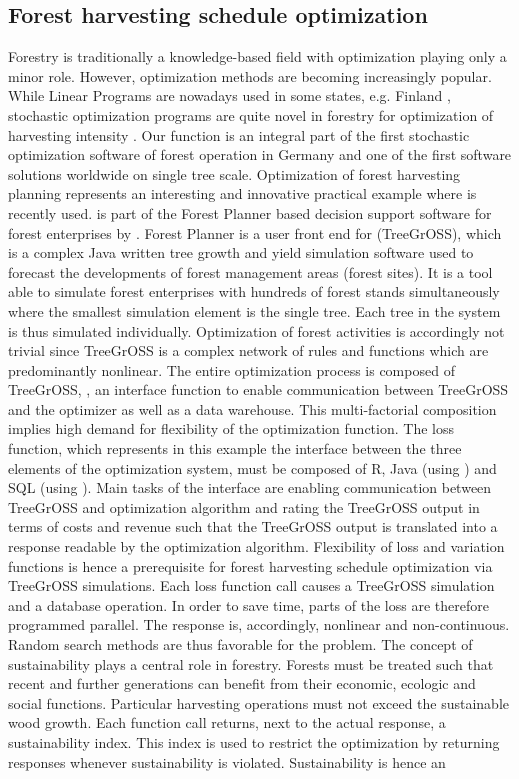 \subsection{Forest harvesting schedule optimization}
Forestry is traditionally a knowledge-based field with optimization playing only a minor role. However, optimization methods are becoming increasingly popular.  While Linear Programs are nowadays used  in some states, e.g. Finland \citep{redsven_2012}, stochastic optimization programs are quite novel in forestry for optimization of harvesting intensity \citep{kangas_2015}. Our function is an integral part of the first stochastic optimization software of forest operation in Germany and one of the first software solutions worldwide on single tree scale. Optimization of forest harvesting planning represents an interesting and innovative practical example where  is recently used.  is part of the Forest Planner based decision support software for forest enterprises by \citet{hansen_2014}. Forest Planner is a user front end for  (TreeGrOSS), which is  a complex Java written tree growth and yield simulation software used to forecast the developments of forest management areas (forest sites). It is a tool able to simulate forest enterprises with hundreds of forest stands simultaneously where the smallest simulation element is the single tree. Each tree in the system is thus simulated individually. Optimization of forest activities is accordingly not trivial since TreeGrOSS is a complex network of rules and functions which are predominantly nonlinear. The entire optimization process is composed of TreeGrOSS, , an interface function to enable communication between TreeGrOSS and the optimizer as well as a data warehouse. This multi-factorial composition implies high demand for flexibility of the optimization function. The loss function, which represents in this example the interface between the three elements of the optimization system, must be composed of R, Java (using ) and SQL (using ). Main tasks of the interface are enabling communication between TreeGrOSS and optimization algorithm and rating the TreeGrOSS output in terms of costs and revenue such that the TreeGrOSS output is translated into a response readable by the optimization algorithm. Flexibility of loss and variation functions is hence a prerequisite for forest harvesting schedule optimization via TreeGrOSS simulations. Each loss function call causes a TreeGrOSS simulation and a database operation. In order to save time, parts of the loss are therefore programmed parallel. The response is, accordingly, nonlinear and non-continuous. Random search methods are thus favorable for the problem. The concept of sustainability plays a central role in forestry. Forests must be treated such that recent and further generations can benefit from their economic, ecologic and social functions. Particular harvesting operations must not exceed the sustainable wood growth. Each function call returns, next to the actual response, a sustainability index. This index is used to restrict the optimization by returning  responses whenever sustainability is violated. Sustainability is hence an 